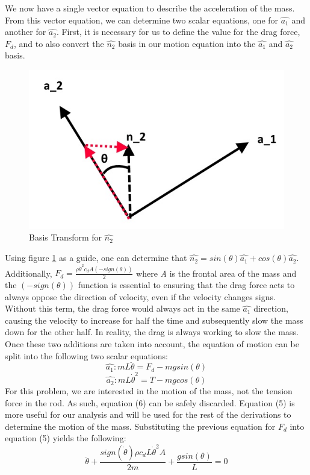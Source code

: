 \documentclass{article}
\begin{document}
	We now have a single vector equation to describe the acceleration of the mass. From this vector equation, we can determine two scalar equations, one for $\hat{a_1}$ and another for $\hat{a_2}$. First, it is necessary for us to define the value for the drag force, $F_d$, and to also convert the $\hat{n_2}$ basis in our motion equation into the $\hat{a_1}$ and $\hat{a_2}$ basis. 	

\begin{figure}[h]
\centering
\includegraphics[width=1\textwidth]{Basis}
\caption{Basis Transform for $\hat{n_2}$}
\label{Basis}
\end{figure}

Using figure \ref{Basis} as a guide, one can determine that $\hat{n_2} = sin(\theta)\hat{a_1} + cos(\theta)\hat{a_2}$. Additionally, $F_d = \frac{\rho\dot{\theta}^2c_dA(-sign(\theta))}{2}$ where \textit{A} is the frontal area of the mass and the $(-sign(\theta))$ function is essential to ensuring that the drag force acts to always oppose the direction of velocity, even if the velocity changes signs. Without this term, the drag force would always act in the same $\hat{a_1}$ direction, causing the velocity to increase for half the time and subsequently slow the mass down for the other half. In reality, the drag is always working to slow the mass. Once these two additions are taken into account, the equation of motion can be split into the following two scalar equations:
	\begin{equation}
	\hat{a_1}: mL\ddot{\theta} = F_d - mgsin(\theta)
	\end{equation}
	\begin{equation}
	\hat{a_2}: mL\dot{\theta}^2 = T - mgcos(\theta)
	\end{equation}
For this problem, we are interested in the motion of the mass, not the tension force in the rod. As such, equation (6) can be safely discarded. Equation (5) is more useful for our analysis and will be used for the rest of the derivations to determine the motion of the mass. Substituting the previous equation for $F_d$ into equation (5) yields the following:
	\begin{equation}
	\boxed{\ddot{\theta} + \frac{sign(\dot{\theta})\rho c_d L \dot{\theta}^2A}{2m} + \frac{gsin(\theta)}{L}=0}
	\end{equation}
	
\end{document}
